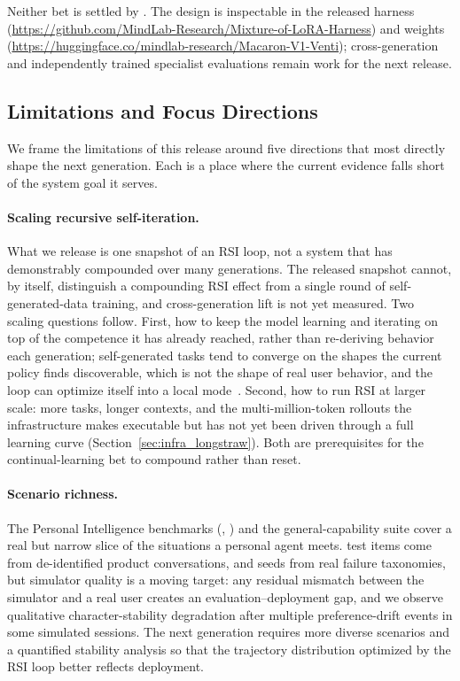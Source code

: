 Neither bet is settled by \macaron{}. The design is inspectable in the released harness (\url{https://github.com/MindLab-Research/Mixture-of-LoRA-Harness}) and \venti{} weights (\url{https://huggingface.co/mindlab-research/Macaron-V1-Venti}); cross-generation and independently trained specialist evaluations remain work for the next release.

\subsection{Limitations and Focus Directions}
\label{sec:disc_limitations}

We frame the limitations of this release around five directions that most directly shape the next generation. Each is a place where the current evidence falls short of the system goal it serves.

\paragraph{Scaling recursive self-iteration.}
What we release is one snapshot of an RSI loop, not a system that has demonstrably compounded over many generations. The released \venti{} snapshot cannot, by itself, distinguish a compounding RSI effect from a single round of self-generated-data training, and cross-generation lift is not yet measured. Two scaling questions follow. First, how to keep the model learning and iterating on top of the competence it has already reached, rather than re-deriving behavior each generation; self-generated tasks tend to converge on the shapes the current policy finds discoverable, which is not the shape of real user behavior, and the loop can optimize itself into a local mode~\citep{macaron_v1_blog2026}. Second, how to run RSI at larger scale: more tasks, longer contexts, and the multi-million-token rollouts the \longstraw{} infrastructure makes executable but has not yet been driven through a full learning curve (Section~\ref{sec:infra_longstraw}). Both are prerequisites for the continual-learning bet to compound rather than reset.

\paragraph{Scenario richness.}
The Personal Intelligence benchmarks (\chatbench, \livingbench) and the general-capability suite cover a real but narrow slice of the situations a personal agent meets. \chatbench{} test items come from de-identified product conversations, and \livingbench{} seeds from real failure taxonomies, but simulator quality is a moving target: any residual mismatch between the simulator and a real user creates an evaluation--deployment gap, and we observe qualitative character-stability degradation after multiple preference-drift events in some simulated sessions. The next generation requires more diverse scenarios and a quantified stability analysis so that the trajectory distribution optimized by the RSI loop better reflects deployment.

